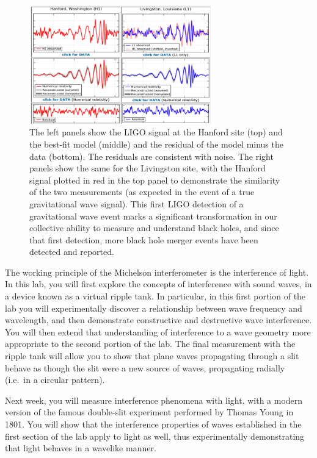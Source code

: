 \begin{figure}
	\centering
	\includegraphics[width=0.7\textwidth]{ripple-tank-remote/ligo-signals.png}
	\caption{The left panels show the LIGO signal at the Hanford site (top) and the best-fit model
		(middle) and the residual of the model minus the data (bottom). The residuals are consistent
		with noise. The right panels show the same for the Livingston site, with the Hanford signal
		plotted in red in the top panel to demonstrate the similarity of the two measurements (as
		expected in the event of a true gravitational wave signal). This first LIGO detection of a
		gravitational wave event marks a significant transformation in our collective ability to
		measure and understand black holes, and since that first detection, more black hole merger
		events have been detected and reported.}\label{rt:fig:ligo-signals}
\end{figure}

The working principle of the Michelson interferometer is the interference of light.
In this lab, you will first explore the concepts of interference with sound waves, in a device known as a virtual ripple tank.
In particular, in this first portion of the lab you will experimentally discover a relationship between wave frequency and wavelength, and then demonstrate constructive and destructive wave interference.
You will then extend that understanding of interference to a wave geometry more appropriate to the second portion of the lab.
The final measurement with the ripple tank will allow you to show that plane waves propagating through a slit behave as though the slit were a new source of waves, propagating radially (i.e.\ in a circular pattern).

Next week, you will measure interference phenomena with light, with a modern version of the famous double-slit experiment performed by Thomas Young in 1801.
You will show that the interference properties of waves established in the first section of the lab apply to light as well, thus experimentally demonstrating that light behaves in a wavelike manner.

